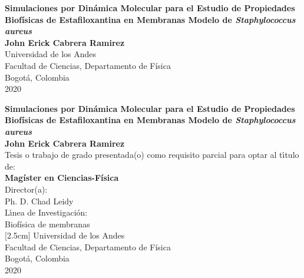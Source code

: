 \begin{center}
\begin{figure}
\centering%
%
\end{figure}
\thispagestyle{empty} \vspace*{1.7cm} \textbf{\huge
Simulaciones por Din\'{a}mica Molecular para el Estudio de Propiedades Biof\'{i}sicas de Estafiloxantina en Membranas Modelo de \textit{Staphylococcus aureus}}\\[5.0cm]
\Large\textbf{John Erick Cabrera Ramirez}\\[6.0cm]
\small Universidad de los Andes\\
Facultad de Ciencias, Departamento de F\'{i}sica\\
Bogot\'{a}, Colombia\\
2020\\
\end{center}

\newpage{\pagestyle{empty}\cleardoublepage}

\newpage
\begin{center}
\thispagestyle{empty} \vspace*{-1cm} \textbf{\huge
Simulaciones por Din\'{a}mica Molecular para el Estudio de Propiedades Biof\'{i}sicas de Estafiloxantina en Membranas Modelo de \textit{Staphylococcus aureus}}\\[3.0cm]
\Large\textbf{John Erick Cabrera Ramirez}\\[3.0cm]
\small Tesis o trabajo de grado presentada(o) como requisito parcial para optar al
t\'{\i}tulo de:\\
\textbf{Mag\'{i}ster en Ciencias-F\'{i}sica}\\[2.0cm]
Director(a):\\
Ph. D. Chad Leidy\\[2.0cm]
L\'{\i}nea de Investigaci\'{o}n:\\
Biof\'{i}sica de membranas\\
[2.5cm]
Universidad de los Andes\\
Facultad de Ciencias, Departamento de F\'{i}sica\\
Bogot\'{a}, Colombia\\
2020\\
\end{center}

